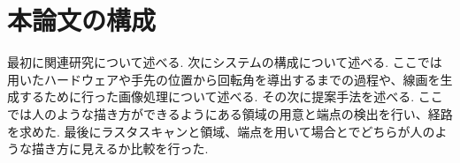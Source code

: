 	\section{本論文の構成}
    \label{sec:construction_of_this_paper}
	最初に関連研究について述べる. 次にシステムの構成について述べる. ここでは用いたハードウェアや手先の位置から回転角を導出するまでの過程や、線画を生成するために行った画像処理について述べる. その次に提案手法を述べる. ここでは人のような描き方ができるようにある領域の用意と端点の検出を行い、経路を求めた. 最後にラスタスキャンと領域、端点を用いて場合とでどちらが人のような描き方に見えるか比較を行った.
    
